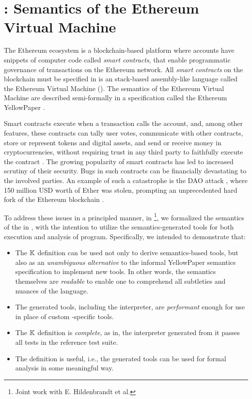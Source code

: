 \section{\KEVM: Semantics of the Ethereum Virtual Machine}\label{sec:kevm}

The Ethereum ecosystem is a blockchain-based platform where accounts
have snippets of computer code called \emph{smart contracts}, that
enable programmatic governance of transactions on the Ethereum network.
All \emph{smart contracts} on the blockchain
must be specified in is an stack-based assembly-like language called
the Ethereum Virtual Machine (\EVM{}). The semantics of the
Ethereum Virtual Machine are described semi-formally in a specification
called the Ethereum YellowPaper \cite{WoodReport14}.

Smart contracts execute when a transaction calls the account, and, among other features,
these contracts can tally user votes, communicate with other contracts,
store or represent tokens and digital assets, and send or receive money in
cryptocurrencies, without requiring trust in any third party to faithfully
execute the contract \cite{SzaboReport94,PetersBook16}.
The growing popularity of smart contracts has led to increased scrutiny of their security.
Bugs in such contracts can be financially devastating to the involved parties.
An example of such a catastrophe is the DAO attack \cite{delCastilloReport16},
 where 150 million USD worth of Ether was stolen,
 prompting an unprecedented hard fork of the Ethereum blockchain
 \cite{DaianReport16}.

To address these issues in a principled manner, in \cite{HildenbrandtCSF18}
\footnote{Joint work with E. Hildenbrandt et al.},
we formalized the semantics of the \EVM{} in \K{}, with the intention to
utilize the semantics-generated tools for both execution and analysis of \KEVM{}
program. Specifically, we intended to demonstrate that:

\begin{itemize}
  \item The $\mathbb{K}$ definition can be used not only to derive semantics-based
  tools, but also as an \emph{unambiguous alternative} to the
  informal YellowPaper semantics specification to implement new tools. In other
  words, the semantics themselves are \emph{readable} to enable one to
  comprehend all subtleties and nuances of the language.
  \item The generated tools, including the interpreter, are \emph{performant}
  enough for use in place of custom \EVM{}-specific tools.
  \item  The $\mathbb{K}$ definition is \emph{complete}, as in, the interpreter
  generated from it passes all tests in the reference test suite.
  \item The definition is useful, i.e., the generated tools can be used for
  formal analysis in some meaningful way.
\end{itemize}

